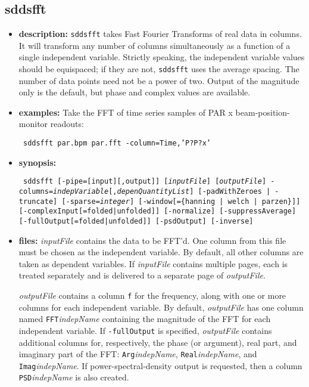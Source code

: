 \newpage
\subsection{sddsfft}
\label{sddsfft}

\begin{itemize}
\item {\bf description:}
{\tt sddsfft} takes Fast Fourier Transforms of real data in columns.  It will transform any number of columns
simultaneously as a function of a single independent variable.  
Strictly speaking, the independent variable values should be equispaced; if they are not, {\tt sddsfft} uses
the average spacing.  The number of data points need not be a power of two.  Output of the magnitude only is the 
default, but phase and complex values are available.
\item {\bf examples:} 
Take the FFT of time series samples of PAR x beam-position-monitor readouts:
\begin{flushleft}{\tt
sddsfft par.bpm par.fft -column=Time,'P?P?x'
}\end{flushleft}
\item {\bf synopsis:} 
\begin{flushleft}{\tt
sddsfft [-pipe=[input][,output]] [{\em inputFile}] [{\em outputFile}]
-columns={\em indepVariable}[,{\em depenQuantityList}]
[-padWithZeroes | -truncate] [-sparse={\em integer}] 
[-window[=\{hanning | welch | parzen\}]] [-complexInput[=folded|unfolded]]
[-normalize] [-suppressAverage] [-fullOutput[=folded|unfolded]] [-psdOutput] [-inverse]
}\end{flushleft}
\item {\bf files:}
{\em inputFile} contains the data to be FFT'd.  One column from this file must be chosen as the independent
variable.   By default, all other columns are taken as dependent variables.  If {\em inputFile} contains multiple
pages, each is treated separately and is delivered to a separate page of {\em outputFile}.

{\em outputFile} contains a column {\tt f} for the frequency, along with one or more columns for each independent
variable.  By default, {\em outputFile} has one column named {\tt FFT}{\em indepName} containing the magnitude of the
FFT for each independent variable. If {\tt -fullOutput} is specified, {\em outputFile} contains additional
columns for, respectively, the phase (or argument), real part, and imaginary part of the FFT: {\tt Arg}{\em indepName},
{\tt Real}{\em indepName}, and {\tt Imag}{\em indepName}.  If power-spectral-density output is requested, then
a column {\tt PSD}{\em indepName} is also created.  


\end{itemize}
